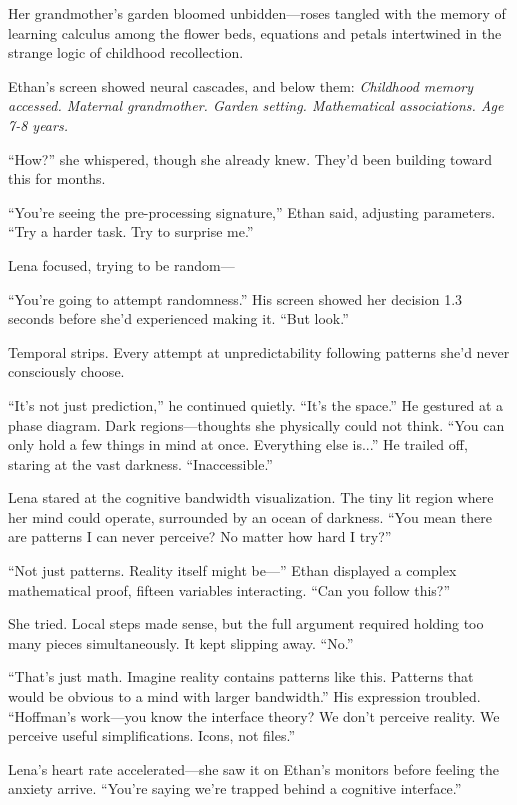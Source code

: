Her grandmother's garden bloomed unbidden—roses tangled with the memory of learning calculus among the flower beds, equations and petals intertwined in the strange logic of childhood recollection.

Ethan's screen showed neural cascades, and below them: \textit{Childhood memory accessed. Maternal grandmother. Garden setting. Mathematical associations. Age 7-8 years.}

``How?'' she whispered, though she already knew. They'd been building toward this for months.

``You're seeing the pre-processing signature,'' Ethan said, adjusting parameters. ``Try a harder task. Try to surprise me.''

Lena focused, trying to be random—

``You're going to attempt randomness.'' His screen showed her decision 1.3 seconds before she'd experienced making it. ``But look.''

Temporal strips. Every attempt at unpredictability following patterns she'd never consciously choose.

``It's not just prediction,'' he continued quietly. ``It's the space.'' He gestured at a phase diagram. Dark regions—thoughts she physically could not think. ``You can only hold a few things in mind at once. Everything else is...'' He trailed off, staring at the vast darkness. ``Inaccessible.''

Lena stared at the cognitive bandwidth visualization. The tiny lit region where her mind could operate, surrounded by an ocean of darkness. ``You mean there are patterns I can never perceive? No matter how hard I try?''

``Not just patterns. Reality itself might be—'' Ethan displayed a complex mathematical proof, fifteen variables interacting. ``Can you follow this?''

She tried. Local steps made sense, but the full argument required holding too many pieces simultaneously. It kept slipping away. ``No.''

``That's just math. Imagine reality contains patterns like this. Patterns that would be obvious to a mind with larger bandwidth.'' His expression troubled. ``Hoffman's work—you know the interface theory? We don't perceive reality. We perceive useful simplifications. Icons, not files.''

Lena's heart rate accelerated—she saw it on Ethan's monitors before feeling the anxiety arrive. ``You're saying we're trapped behind a cognitive interface.''

